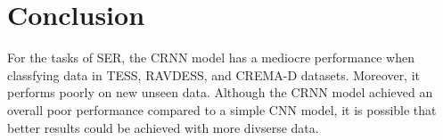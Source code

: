 \documentclass[../main.tex]{subfiles}
\begin{document}
\section{Conclusion}

For the tasks of SER, the CRNN model has a mediocre performance when 
classfying data in TESS, RAVDESS, and CREMA-D datasets. Moreover, it performs 
poorly on new unseen data. Although the CRNN model  achieved an overall 
poor performance compared to a simple CNN model, it is possible that 
better results could be achieved with more divserse data.
\end{document}
